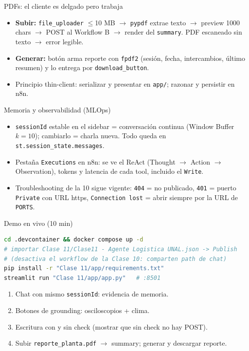 \documentclass[aspectratio=169,11pt]{beamer}
\begin{document}
\begin{frame}{PDFs: el cliente es delgado pero trabaja}
  \begin{itemize}
    \item \textbf{Subir:} \texttt{file\_uploader} $\le$10 MB $\to$ \texttt{pypdf} extrae texto $\to$ preview 1000 chars $\to$ POST al Workflow B $\to$ render del \texttt{summary}. PDF escaneado sin texto $\to$ error legible.
    \item \textbf{Generar:} botón arma reporte con \texttt{fpdf2} (sesión, fecha, intercambios, último resumen) y lo entrega por \texttt{download\_button}.
    \item Principio thin-client: serializar y presentar en \texttt{app/}; razonar y persistir en n8n.
  \end{itemize}
\end{frame}

\begin{frame}{Memoria y observabilidad (MLOps)}
  \begin{itemize}
    \item \texttt{sessionId} estable en el sidebar = conversación continua (Window Buffer $k=10$); cambiarlo = charla nueva. Todo queda en \texttt{st.session\_state.messages}.
    \item Pestaña \texttt{Executions} en n8n: se ve el ReAct (Thought $\to$ Action $\to$ Observation), tokens y latencia de cada tool, incluido el \texttt{Write}.
    \item Troubleshooting de la 10 sigue vigente: \texttt{404} = no publicado, \texttt{401} = puerto \texttt{Private} con URL https, \texttt{Connection lost} = abrir siempre por la URL de \texttt{PORTS}.
  \end{itemize}
\end{frame}

\begin{frame}[fragile]{Demo en vivo (10 min)}
\begin{lstlisting}[language=bash]
cd .devcontainer && docker compose up -d
# importar Clase 11/Clase11 - Agente Logistica UNAL.json -> Publish
# (desactiva el workflow de la Clase 10: comparten path de chat)
pip install -r "Clase 11/app/requirements.txt"
streamlit run "Clase 11/app/app.py"   # :8501
\end{lstlisting}
  \begin{enumerate}
    \item Chat con mismo \texttt{sessionId}: evidencia de memoria.
    \item Botones de grounding: osciloscopios + clima.
    \item Escritura con y sin check (mostrar que sin check no hay POST).
    \item Subir \texttt{reporte\_planta.pdf} $\to$ summary; generar y descargar reporte.
  \end{enumerate}
\end{frame}
\end{document}
